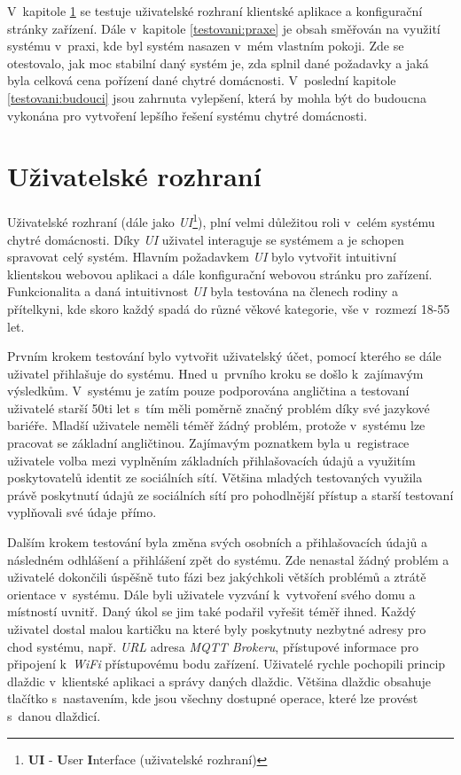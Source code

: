 V~kapitole \ref{testovani:UI} se testuje uživatelské rozhraní klientské aplikace a konfigurační stránky zařízení.
Dále v~kapitole \ref{testovani:praxe} je obsah směřován na využití systému v~praxi, kde byl systém nasazen v~mém vlastním pokoji.
Zde se otestovalo, jak moc stabilní daný systém je, zda splnil dané požadavky a jaká byla celková cena pořízení dané chytré domácnosti.
V~poslední kapitole \ref{testovani:budouci} jsou zahrnuta vylepšení, která by mohla být do budoucna vykonána pro vytvoření lepšího řešení systému chytré domácnosti.

\section{Uživatelské rozhraní}
\label{testovani:UI}
Uživatelské rozhraní (dále jako \emph{UI}\footnote{\textbf{UI} - \textbf{U}ser \textbf{I}nterface (uživatelské rozhraní)}), plní velmi důležitou roli v~celém systému chytré domácnosti.
Díky \emph{UI} uživatel interaguje se systémem a je schopen spravovat celý systém.
Hlavním požadavkem \emph{UI} bylo vytvořit intuitivní klientskou webovou aplikaci a dále konfigurační webovou stránku pro zařízení.
Funkcionalita a daná intuitivnost \emph{UI} byla testována na členech rodiny a přítelkyni, kde skoro každý spadá do různé věkové kategorie, vše v~rozmezí 18-55 let.

Prvním krokem testování bylo vytvořit uživatelský účet, pomocí kterého se dále uživatel přihlašuje do systému.
Hned u~prvního kroku se došlo k~zajímavým výsledkům.
V~systému je zatím pouze podporována angličtina a testovaní uživatelé starší 50ti let s~tím měli poměrně značný problém díky své jazykové bariéře.
Mladší uživatele neměli téměř žádný problém, protože v~systému lze pracovat se základní angličtinou.
Zajímavým poznatkem byla u~registrace uživatele volba mezi vyplněním základních přihlašovacích údajů a využitím poskytovatelů identit ze sociálních sítí.
Většina mladých testovaných využila právě poskytnutí údajů ze sociálních sítí pro pohodlnější přístup a starší testovaní vyplňovali své údaje přímo.

Dalším krokem testování byla změna svých osobních a přihlašovacích údajů a následném odhlášení a přihlášení zpět do systému.
Zde nenastal žádný problém a uživatelé dokončili úspěšně tuto fázi bez jakýchkoli větších problémů a ztrátě orientace v~systému.
\newpage
Dále byli uživatele vyzvání k~vytvoření svého domu a místností uvnitř.
Daný úkol se jim také podařil vyřešit téměř ihned.
Každý uživatel dostal malou kartičku na které byly poskytnuty nezbytné adresy pro chod systému, např. \emph{URL} adresa \emph{MQTT Brokeru}, přístupové informace pro připojení k~\emph{WiFi} přístupovému bodu zařízení.
Uživatelé rychle pochopili princip dlaždic v~klientské aplikaci a správy daných dlaždic.
Většina dlaždic obsahuje tlačítko s~nastavením, kde jsou všechny dostupné operace, které lze provést s~danou dlaždicí.

